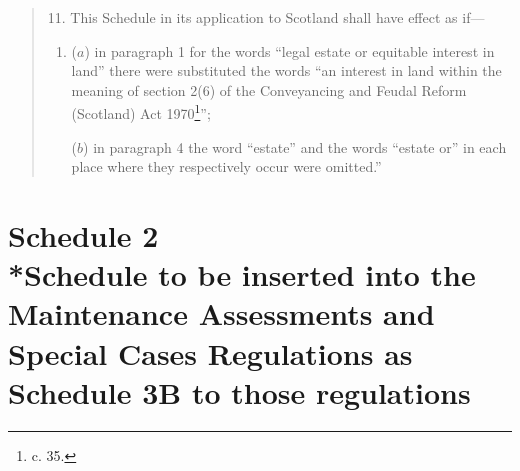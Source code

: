 \documentclass[a4paper]{article}
\newcommand{\parthead}{}
\begin{document}
\begin{quotation}
\medskip

11.  This Schedule in its application to Scotland shall have effect as if—
\begin{enumerate}\item[]
($a$) in paragraph 1 for the words “legal estate or equitable interest in land” there were substituted the words “an interest in land within the meaning of section 2(6) of the Conveyancing and Feudal Reform (Scotland) Act 1970\footnote{ c. 35.}”;

($b$) in paragraph 4 the word “estate” and the words “estate or” in each place where they respectively occur were omitted.''
\end{enumerate}
\end{quotation}

\part[Schedule 2 --- Schedule to be inserted into the Maintenance Assessments and Special Cases Regulations as Schedule 3B to those regulations]{Schedule 2\\*Schedule to be inserted into the Maintenance Assessments and Special Cases Regulations as Schedule 3B to those regulations}

\renewcommand\parthead{--- Schedule 2}
\end{document}
